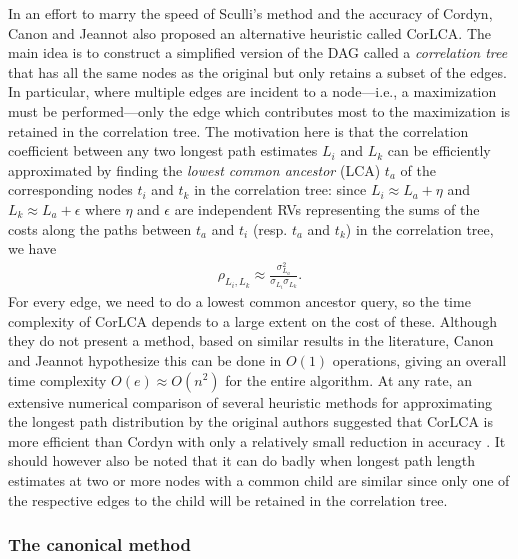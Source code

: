 \documentclass[12pt]{article}
\begin{document}
In an effort to marry the speed of Sculli's method and the accuracy of Cordyn, Canon and Jeannot also proposed an alternative heuristic called CorLCA. The main idea is to construct a simplified version of the DAG called a {\em correlation tree} that has all the same nodes as the original but only retains a subset of the edges. In particular, where multiple edges are incident to a node---i.e., a maximization must be performed---only the edge which contributes most to the maximization is retained in the correlation tree. The motivation here is that the correlation coefficient between any two longest path estimates $L_i$ and $L_k$ can be efficiently approximated by finding the {\em lowest common ancestor} (LCA) $t_{a}$ of the corresponding nodes $t_i$ and $t_k$ in the correlation tree: since $L_i \approx L_a + \eta$ and $L_k \approx L_a + \epsilon$ where $\eta$ and $\epsilon$ are independent RVs representing the sums of the costs along the paths between $t_a$ and $t_i$ (resp. $t_a$ and $t_k$) in the correlation tree, we have
\begin{align*}
  \rho_{L_i, L_k} \approx \frac{\sigma_{L_a}^2}{\sigma_{L_i}\sigma_{L_k}}. %
  \end{align*}
  For every edge, we need to do a lowest common ancestor query, so the time complexity of CorLCA depends to a large extent on the cost of these. Although they do not present a method, based on similar results in the literature, Canon and Jeannot hypothesize this can be done in $O(1)$ operations, giving an overall time complexity $O(e) \approx O(n^2)$ for the entire algorithm. At any rate, an extensive numerical comparison of several heuristic methods for approximating the longest path distribution by the original authors suggested that CorLCA is more efficient than Cordyn with only a relatively small reduction in accuracy \cite{can16}. It should however also be noted that it can do badly when longest path length estimates at two or more nodes with a common child are similar since only one of the respective edges to the child will be retained in the correlation tree.

  \subsubsection{The canonical method}
\label{subsubsect.canonical}
\end{document}
